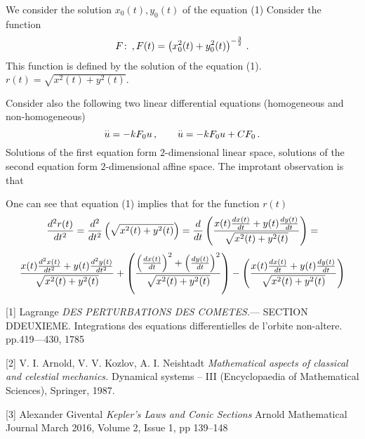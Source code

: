 We consider the solution  $x_0(t), y_0(t)$
of the equation (1)
Consider the function 
            $$
   F\colon\,, F(t)=\left(x_0^2(t)+y_0^2(t)\right)^{-{3\over 2}}\,.
            $$
This function is defined by the solution of the equation (1).
$r(t)=\sqrt{x^2(t)+y^2(t)}$.

Consider also the following two linear differential equations
(homogeneous and non-homogeneous)
                 $$
  {\buildrel ..\over u}=-kF_0 u\,,\qquad
     {\buildrel ..\over u}=-kF_0 u+CF_0\,.
                 $$
 Solutions of the first equation form $2$-dimensional linear space,
solutions of the second equation form $2$-dimensional
 affine space.  The improtant observation is that


  One can see that equation (1) implies that
for the function $r(t)$ 
         $$
{d^2r(t)\over dt^2}=
          {d^2\over dt^2}
      \left(\sqrt{x^2(t)+y^2(t)}\right)
         = {d\over dt}
      \left(
    x(t){dx(t)\over dt}+
    y(t){dy(t)\over dt}
         \over 
\sqrt{x^2(t)+y^2(t)}
      \right)=
         $$
           $$
         {
    x(t){d^2x(t)\over dt^2}+
    y(t){d^2y(t)\over dt^2}
         \over 
\sqrt{x^2(t)+y^2(t)}
            }+
       \left(
    \left({dx(t)\over dt}\right)^2+
    \left({dy(t)\over dt}\right)^2
         \over 
\sqrt{x^2(t)+y^2(t)}
      \right)-
         \left(
    x(t){dx(t)\over dt}+
    y(t){dy(t)\over dt}
         \over 
\sqrt{x^2(t)+y^2(t)}
      \right)
           $$
                 



[1] Lagrange  {\it DES PERTURBATIONS DES COMETES.}---
            SECTION DDEUXIEME.  Integrations des equations differentielles
de l'orbite non-altere. pp.419---430,  1785


[2] V. I. Arnold, V. V. Kozlov, A. I. Neishtadt
{\it  Mathematical aspects of classical 
and celestial mechanics.}
 Dynamical systems – III 
(Encyclopaedia of Mathematical Sciences), 
Springer, 1987.



[3] Alexander Givental 
{\it Kepler’s Laws and Conic Sections}
  Arnold Mathematical Journal March 2016, 
Volume 2, Issue 1, pp 139–148




\bye
